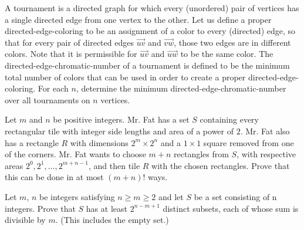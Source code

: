 \documentclass[mast]{lucky}
\begin{document}
\begin{prob}{9}
A tournament is a directed graph for which every (unordered) pair of vertices has a single directed edge from one vertex to the other.  Let us define a proper directed-edge-coloring to be an assignment of a color to every (directed) edge, so that for every pair of directed edges $\overrightarrow{uv}$ and $\overrightarrow{vw}$, those two edges are in different colors.  Note that it is permissible for $\overrightarrow{uv}$ and $\overrightarrow{uw}$ to be the same color.  The directed-edge-chromatic-number of a tournament is defined to be the minimum total number of colors that can be used in order to create a proper directed-edge-coloring.  For each $n$, determine the minimum directed-edge-chromatic-number over all tournaments on $n$ vertices.
\end{prob}

\begin{prob}{13}
Let $m$ and $n$ be positive integers.  Mr. Fat has a set $S$ containing every rectangular tile with integer side lengths and area of a power of $2$.  Mr. Fat also has a rectangle $R$ with dimensions $2^m \times 2^n$ and a $1 \times 1$ square removed from one of the corners.  Mr. Fat wants to choose $m + n$ rectangles from $S$, with respective areas $2^0, 2^1, \ldots, 2^{m + n - 1}$, and then tile $R$ with the chosen rectangles.  Prove that this can be done in at most $(m + n)!$ ways.
\end{prob}

\begin{prob}{13}
Let $m$, $n$ be integers satisfying $n \geq m \geq 2$ and let $S$ be a set consisting of n integers. Prove that $S$ has at least $2^{n-m+1}$ distinct subsets, each of whose sum is divisible by $m$. (This includes the empty set.)
\end{prob}
\end{document}
